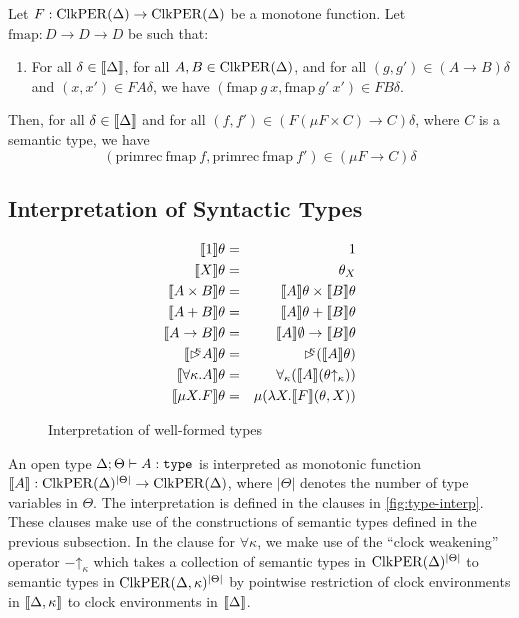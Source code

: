 \begin{lemma}\label{lem:primrec-well-typed}
  Let $F : \mathrm{ClkPER}(\Delta) \to \mathrm{ClkPER}(\Delta)$ be a monotone
  function.  Let $\mathrm{fmap} : D \to D \to D$ be such that:
  \begin{enumerate}
  \item For all $\delta \in \llbracket \Delta \rrbracket$, for all $A,B \in
    \mathrm{ClkPER}(\Delta)$, and for all $(g,g') \in (A \to B)\delta$ and
    $(x,x') \in FA\delta$, we have $(\mathrm{fmap}\ g\ x,
    \mathrm{fmap}\ g'\ x') \in FB\delta$.
  \end{enumerate}
  Then, for all $\delta \in \llbracket \Delta \rrbracket$ and for all $(f,f') \in
  (F(\mu F \times C) \to C)\delta$, where $C$ is a semantic type, we
  have
  \begin{displaymath}
    (\mathrm{primrec}\ \mathrm{fmap}\ f, \mathrm{primrec}\ \mathrm{fmap}\ f') \in (\mu F \to C)\delta
  \end{displaymath}
\end{lemma}

\subsection{Interpretation of Syntactic Types}\label{sec:type-interp}

\begin{figure}[t]
  \centering
  \begin{eqnarray*}
    \llbracket 1 \rrbracket\theta & = & 1 \\
    \llbracket X \rrbracket\theta & = & \theta_X \\
    \llbracket A \times B \rrbracket\theta & = & \llbracket A \rrbracket\theta \times \llbracket B \rrbracket\theta \\
    \llbracket A + B \rrbracket\theta & = & \llbracket A \rrbracket\theta + \llbracket B \rrbracket\theta \\
    \llbracket A \to B \rrbracket\theta & = & \llbracket A \rrbracket\emptyset \to \llbracket B \rrbracket\theta \\
    \llbracket \mathord{\rhd\kern-0.4em^{\kappa}} A \rrbracket\theta & = & \mathord{\rhd\kern-0.4em^{\kappa}} (\llbracket A \rrbracket\theta) \\
    \llbracket \forall \kappa. A \rrbracket\theta & = & \forall_\kappa (\llbracket A \rrbracket(\theta\mathord\uparrow_\kappa)) \\
    \llbracket \mu X. F \rrbracket\theta & = & \mu (\lambda X. \llbracket F \rrbracket(\theta, X))
  \end{eqnarray*}
  \caption{Interpretation of well-formed types}
  \label{fig:type-interp}
\end{figure}

An open type $\Delta; \Theta \vdash A : \texttt{type}$ is interpreted as
monotonic function $\llbracket A \rrbracket : \mathrm{ClkPER}(\Delta)^{|\Theta|} \to
\mathrm{ClkPER}(\Delta)$, where $|\Theta|$ denotes the number of type
variables in $\Theta$. The interpretation is defined in the clauses in
\autoref{fig:type-interp}. These clauses make use of the constructions
of semantic types defined in the previous subsection. In the clause
for $\forall \kappa$, we make use of the ``clock weakening'' operator
$-\mathord\uparrow_\kappa$ which takes a collection of semantic types
in $\mathrm{ClkPER}(\Delta)^{|\Theta|}$ to semantic types in
$\mathrm{ClkPER}(\Delta,\kappa)^{|\Theta|}$ by pointwise restriction of clock
environments in $\llbracket \Delta, \kappa \rrbracket$ to clock environments in
$\llbracket \Delta \rrbracket$.

